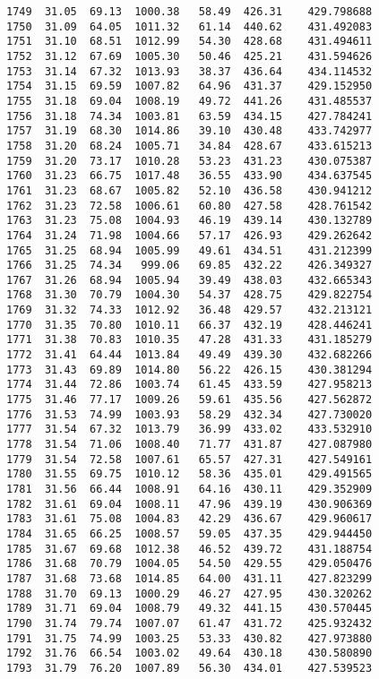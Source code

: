 \documentclass[11pt]{article}
\begin{document}
\begin{tcolorbox}[breakable, size=fbox, boxrule=.5pt, pad at break*=1mm, opacityfill=0]
\begin{Verbatim}[commandchars=\\\{\}]
1749  31.05  69.13  1000.38   58.49  426.31    429.798688
1750  31.09  64.05  1011.32   61.14  440.62    431.492083
1751  31.10  68.51  1012.99   54.30  428.68    431.494611
1752  31.12  67.69  1005.30   50.46  425.21    431.594626
1753  31.14  67.32  1013.93   38.37  436.64    434.114532
1754  31.15  69.59  1007.82   64.96  431.37    429.152950
1755  31.18  69.04  1008.19   49.72  441.26    431.485537
1756  31.18  74.34  1003.81   63.59  434.15    427.784241
1757  31.19  68.30  1014.86   39.10  430.48    433.742977
1758  31.20  68.24  1005.71   34.84  428.67    433.615213
1759  31.20  73.17  1010.28   53.23  431.23    430.075387
1760  31.23  66.75  1017.48   36.55  433.90    434.637545
1761  31.23  68.67  1005.82   52.10  436.58    430.941212
1762  31.23  72.58  1006.61   60.80  427.58    428.761542
1763  31.23  75.08  1004.93   46.19  439.14    430.132789
1764  31.24  71.98  1004.66   57.17  426.93    429.262642
1765  31.25  68.94  1005.99   49.61  434.51    431.212399
1766  31.25  74.34   999.06   69.85  432.22    426.349327
1767  31.26  68.94  1005.94   39.49  438.03    432.665343
1768  31.30  70.79  1004.30   54.37  428.75    429.822754
1769  31.32  74.33  1012.92   36.48  429.57    432.213121
1770  31.35  70.80  1010.11   66.37  432.19    428.446241
1771  31.38  70.83  1010.35   47.28  431.33    431.185279
1772  31.41  64.44  1013.84   49.49  439.30    432.682266
1773  31.43  69.89  1014.80   56.22  426.15    430.381294
1774  31.44  72.86  1003.74   61.45  433.59    427.958213
1775  31.46  77.17  1009.26   59.61  435.56    427.562872
1776  31.53  74.99  1003.93   58.29  432.34    427.730020
1777  31.54  67.32  1013.79   36.99  433.02    433.532910
1778  31.54  71.06  1008.40   71.77  431.87    427.087980
1779  31.54  72.58  1007.61   65.57  427.31    427.549161
1780  31.55  69.75  1010.12   58.36  435.01    429.491565
1781  31.56  66.44  1008.91   64.16  430.11    429.352909
1782  31.61  69.04  1008.11   47.96  439.19    430.906369
1783  31.61  75.08  1004.83   42.29  436.67    429.960617
1784  31.65  66.25  1008.57   59.05  437.35    429.944450
1785  31.67  69.68  1012.38   46.52  439.72    431.188754
1786  31.68  70.79  1004.05   54.50  429.55    429.050476
1787  31.68  73.68  1014.85   64.00  431.11    427.823299
1788  31.70  69.13  1000.29   46.27  427.95    430.320262
1789  31.71  69.04  1008.79   49.32  441.15    430.570445
1790  31.74  79.74  1007.07   61.47  431.72    425.932432
1791  31.75  74.99  1003.25   53.33  430.82    427.973880
1792  31.76  66.54  1003.02   49.64  430.18    430.580890
1793  31.79  76.20  1007.89   56.30  434.01    427.539523

\end{Verbatim}
\end{tcolorbox}
\end{document}
